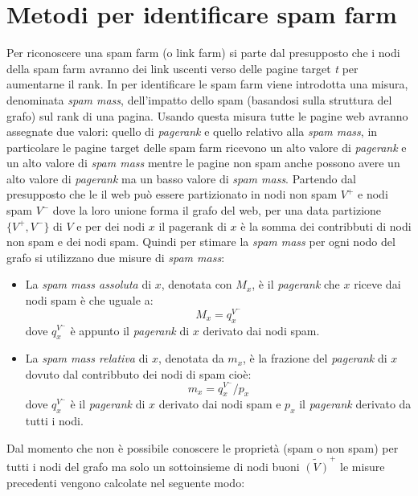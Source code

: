 \section{Metodi per identificare spam farm}
Per riconoscere una spam farm (o link farm) si parte dal presupposto che i nodi della spam farm avranno dei link uscenti verso delle pagine target \textit{t} per aumentarne il rank. In \cite{Gyongyi:2006:LSD:1182635.1164166} per identificare le spam farm viene introdotta una misura, denominata \textit{spam mass}, dell'impatto dello spam (basandosi sulla struttura del grafo) sul rank di una pagina. Usando questa misura tutte le pagine web avranno assegnate due valori: quello di \textit{pagerank} e quello relativo alla \textit{spam mass}, in particolare le pagine target delle spam farm ricevono  un alto valore di \textit{pagerank} e un alto valore di \textit{spam mass} mentre le pagine non spam anche possono avere un alto valore di \textit{pagerank} ma un basso valore di \textit{spam mass}. Partendo dal presupposto che le il web può essere partizionato in nodi non spam \(V^+\) e nodi spam \(V^-\) dove la loro unione forma il grafo del web, per una data partizione \(\{V^+,V^-\}\) di \(V\) e per dei nodi \(x\) 
il pagerank di \(x\) è la somma dei contribbuti di nodi non spam e dei nodi spam. Quindi per stimare la \textit{spam mass} per ogni nodo del grafo si utilizzano due misure di \textit{spam mass}:
\begin{itemize}
 \item La \textit{spam mass assoluta} di \(x\), denotata con \(M_x\), è il \textit{pagerank} che \(x\) riceve dai nodi spam è che uguale a:
 \begin{equation}
   M_x=q_x^{V^-}
 \end{equation}
dove \(q_x^{V^-}\) è appunto il \textit{pagerank} di \(x\) derivato dai nodi spam.
 \item La \textit{spam mass relativa} di \(x\), denotata da \(m_x\), è la frazione del \textit{pagerank} di \(x\) dovuto dal contribbuto dei nodi di spam cioè: 
 \begin{equation}
   m_x=q_x^{V^-}/p_x
 \end{equation}
dove \(q_x^{V^-}\) è il \textit{pagerank} di \(x\) derivato dai nodi spam e \(p_x\) il \textit{pagerank} derivato da tutti i nodi.
\end{itemize}
Dal momento che non è possibile conoscere le proprietà (spam o non spam) per tutti i nodi del grafo ma solo un sottoinsieme di nodi buoni \(\tilde{(V)}^+\) le misure precedenti vengono calcolate nel seguente modo:
